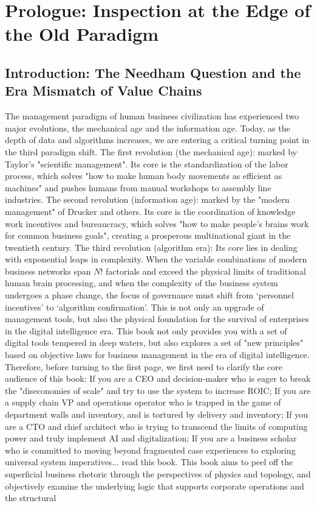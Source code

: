 \documentclass[11pt,a4paper]{article}
\begin{document}
\newpage
\tableofcontents
\newpage

\section*{Prologue: Inspection at the Edge of the Old Paradigm}


\subsection*{Introduction: The Needham Question and the Era Mismatch of Value Chains}
The management paradigm of human business civilization has experienced two major evolutions, the mechanical age and the information age. Today, as the depth of data and algorithms increases, we are entering a critical turning point in the third paradigm shift. The first revolution (the mechanical age): marked by Taylor's "scientific management". Its core is the standardization of the labor process, which solves "how to make human body movements as efficient as machines" and pushes humans from manual workshops to assembly line industries. The second revolution (information age): marked by the "modern management" of Drucker and others. Its core is the coordination of knowledge work incentives and bureaucracy, which solves "how to make people's brains work for common business goals", creating a prosperous multinational giant in the twentieth century. The third revolution (algorithm era): Its core lies in dealing with exponential leaps in complexity. When the variable combinations of modern business networks span $N!$ factorials and exceed the physical limits of traditional human brain processing, and when the complexity of the business system undergoes a phase change, the focus of governance must shift from ‘personnel incentives’ to ‘algorithm confirmation’. This is not only an upgrade of management tools, but also the physical foundation for the survival of enterprises in the digital intelligence era. This book not only provides you with a set of digital tools tempered in deep waters, but also explores a set of "new principles" based on objective laws for business management in the era of digital intelligence. Therefore, before turning to the first page, we first need to clarify the core audience of this book: If you are a CEO and decision-maker who is eager to break the "diseconomies of scale" and try to use the system to increase ROIC; If you are a supply chain VP and operations operator who is trapped in the game of department walls and inventory, and is tortured by delivery and inventory; If you are a CTO and chief architect who is trying to transcend the limits of computing power and truly implement AI and digitalization; If you are a business scholar who is committed to moving beyond fragmented case experiences to exploring universal system imperatives... read this book. This book aims to peel off the superficial business rhetoric through the perspectives of physics and topology, and objectively examine the underlying logic that supports corporate operations and the structural 
\end{document}
